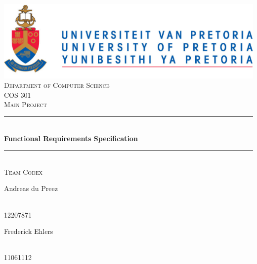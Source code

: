 \begin{titlepage}
	
	\begin{center}
		\includegraphics[width=1\textwidth]{../Images/University_of_Pretoria_Logo.PNG}\\[0.5cm]    
		\textsc{\LARGE Department of Computer Science}\\[0.5cm]
		\textsc{\Large COS 301}\\[0.5cm]
		\textsc{\Large Main Project} \nocite{ref}\\[0.75cm]
		\rule{\linewidth}{0.5mm} \\[0.4cm]
		{ \huge \bfseries Functional Requirements Specification}\\[0.5cm]
		\rule{\linewidth}{0.5mm} \\[1cm]
		
		\textsc{\Large Team Codex}\\[1cm]		
		
		
		\begin{minipage}{0.4\textwidth}
			\begin{flushleft} \large
				Andreas {du Preez}
			\end{flushleft}
		\end{minipage}
		\begin{minipage}{0.4\textwidth}
			\begin{flushright} \large
				\emph{} \\
				12207871 
			\end{flushright}
		\end{minipage}
		
		
		\begin{minipage}{0.4\textwidth}
			\begin{flushleft} \large
				Frederick {Ehlers}
			\end{flushleft}
		\end{minipage}
		\begin{minipage}{0.4\textwidth}
			\begin{flushright} \large
				\emph{} \\
				11061112  
			\end{flushright}
		\end{minipage}
		

\end{center}
\end{titlepage}
